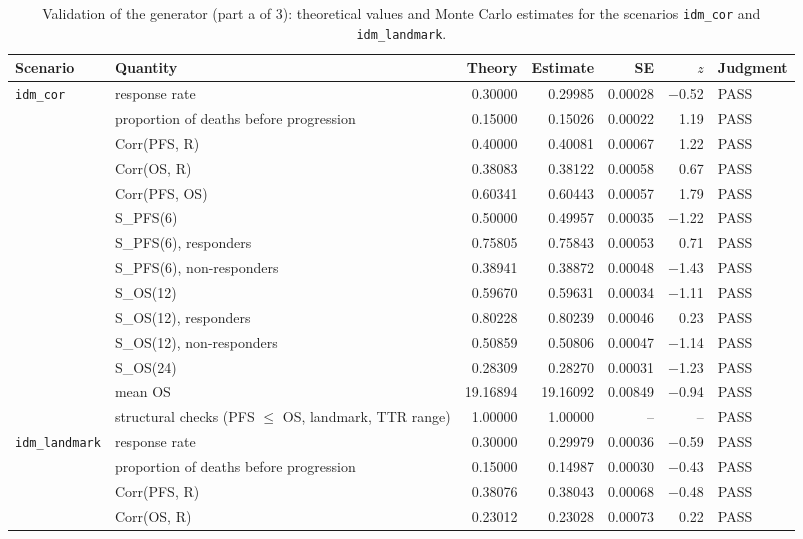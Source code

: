 \begin{table}[htbp]
\centering
\caption{Validation of the generator (part a of 3): theoretical values and Monte Carlo estimates for the scenarios \texttt{idm\_cor} and \texttt{idm\_landmark}.}
\label{tab:generatora}
\begin{threeparttable}
\scriptsize\setlength{\tabcolsep}{3pt}
\begin{tabular}{p{2.4cm}p{4.2cm}rrrrl}
\toprule
Scenario & Quantity & Theory & Estimate & SE & $z$ & Judgment \\
\midrule
\texttt{idm\_cor} & response rate & 0.30000 & 0.29985 & 0.00028 & $-$0.52 & PASS \\
 & proportion of deaths before progression & 0.15000 & 0.15026 & 0.00022 & 1.19 & PASS \\
 & Corr(PFS, R) & 0.40000 & 0.40081 & 0.00067 & 1.22 & PASS \\
 & Corr(OS, R) & 0.38083 & 0.38122 & 0.00058 & 0.67 & PASS \\
 & Corr(PFS, OS) & 0.60341 & 0.60443 & 0.00057 & 1.79 & PASS \\
 & S\_PFS(6) & 0.50000 & 0.49957 & 0.00035 & $-$1.22 & PASS \\
 & S\_PFS(6), responders & 0.75805 & 0.75843 & 0.00053 & 0.71 & PASS \\
 & S\_PFS(6), non-responders & 0.38941 & 0.38872 & 0.00048 & $-$1.43 & PASS \\
 & S\_OS(12) & 0.59670 & 0.59631 & 0.00034 & $-$1.11 & PASS \\
 & S\_OS(12), responders & 0.80228 & 0.80239 & 0.00046 & 0.23 & PASS \\
 & S\_OS(12), non-responders & 0.50859 & 0.50806 & 0.00047 & $-$1.14 & PASS \\
 & S\_OS(24) & 0.28309 & 0.28270 & 0.00031 & $-$1.23 & PASS \\
 & mean OS & 19.16894 & 19.16092 & 0.00849 & $-$0.94 & PASS \\
 & structural checks (PFS $\le$ OS, landmark, TTR range) & 1.00000 & 1.00000 & -- & -- & PASS \\
\midrule
\texttt{idm\_landmark} & response rate & 0.30000 & 0.29979 & 0.00036 & $-$0.59 & PASS \\
 & proportion of deaths before progression & 0.15000 & 0.14987 & 0.00030 & $-$0.43 & PASS \\
 & Corr(PFS, R) & 0.38076 & 0.38043 & 0.00068 & $-$0.48 & PASS \\
 & Corr(OS, R) & 0.23012 & 0.23028 & 0.00073 & 0.22 & PASS \\

\end{tabular}
\end{threeparttable}
\end{table}
